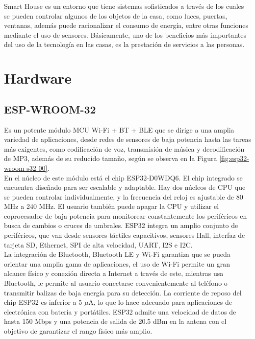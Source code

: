 Smart House es un entorno que tiene sistemas sofisticados a través de los cuales se pueden controlar algunos de los objetos de la casa, como luces, puertas, ventanas, además puede racionalizar el consumo de energía, entre otras funciones mediante el uso de sensores. Básicamente, uno de los beneficios más importantes del uso de la tecnología en las casas, es la prestación de servicios a las personas.\cite{Howedi2016} 

\section{Hardware}

\subsection{ESP-WROOM-32}

Es un potente módulo MCU Wi-Fi + BT + BLE que se dirige a una amplia variedad de aplicaciones, desde redes de sensores de baja potencia hasta las tareas más exigentes, como codificación de voz, transmisión de música y decodificación de MP3, además de su reducido tamaño, según se observa en la Figura \ref{fig:esp32-wroom-s32-00}.\\

En el núcleo de este módulo está el chip ESP32-D0WDQ6. El chip integrado se encuentra diseñado para ser escalable y adaptable. Hay dos núcleos de CPU que se pueden controlar individualmente, y la frecuencia del reloj es ajustable de 80 MHz a 240 MHz. El usuario también puede apagar la CPU y utilizar el coprocesador de baja potencia para monitorear constantemente los periféricos en busca de cambios o cruces de umbrales. ESP32 integra un amplio conjunto de periféricos, que van desde sensores táctiles capacitivos, sensores Hall, interfaz de tarjeta SD, Ethernet, SPI de alta velocidad, UART, I2S e I2C.\\

La integración de Bluetooth, Bluetooth LE y Wi-Fi garantiza que se pueda orientar una amplia gama de aplicaciones, el uso de Wi-Fi permite un gran alcance físico y conexión directa a Internet a través de este, mientras usa Bluetooth, le permite al usuario conectarse convenientemente al teléfono o transmitir balizas de baja energía para su detección. La corriente de reposo del chip ESP32 es inferior a 5 $\mu$A, lo que lo hace adecuado para aplicaciones de electrónica con batería y portátiles. ESP32 admite una velocidad de datos de hasta 150 Mbps y una potencia de salida de 20.5 dBm en la antena con el objetivo de garantizar el rango físico más amplio.\\

